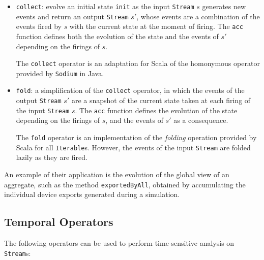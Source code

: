 \begin{itemize}
  \item \texttt{collect}: evolve an initial state \texttt{init} as the
        input \texttt{Stream} $s$ generates new events and return an output
        \texttt{Stream} $s'$, whose events are a combination of the events
        fired by $s$ with the current state at the moment of firing. The
        \texttt{acc} function defines both the evolution of the state and the
        events of $s'$ depending on the firings of $s$.

        The \texttt{collect} operator is an adaptation for Scala of the
        homonymous operator provided by \texttt{Sodium} in Java.

  \item \texttt{fold}: a simplification of the \texttt{collect}
        operator, in which the events of the output \texttt{Stream} $s'$ are a
        snapshot of the current state taken at each firing of the input
        \texttt{Stream} $s$. The \texttt{acc} function defines the evolution of
        the state depending on the firings of $s$, and the events of $s'$ as a
        consequence.

        The \texttt{fold} operator is an implementation of the \textit{folding}
        operation provided by Scala for all \texttt{Iterable}s. However, the
        events of the input \texttt{Stream} are folded lazily as they are
        fired.
\end{itemize}

An example of their application is the evolution of the global view of an
aggregate, such as the method \texttt{exportedByAll}, obtained by accumulating
the individual device exports generated during a simulation.

\subsection{Temporal Operators}

The following operators can be used to perform time-sensitive analysis on
\texttt{Stream}s:

